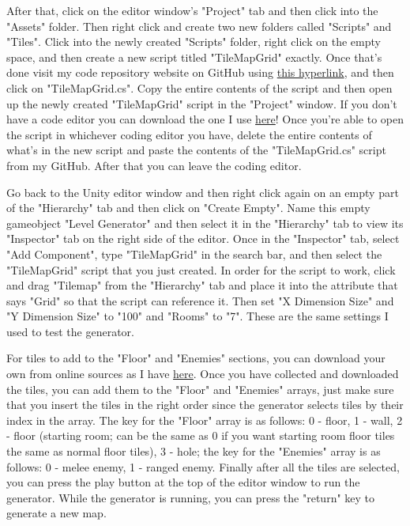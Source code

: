 \documentclass[10pt,twocolumn]{article}
\begin{document}
After that, click on the editor window's "Project" tab and then click into the "Assets" folder. Then right click and create two new folders called "Scripts" and "Tiles". Click into the newly created "Scripts" folder, right click on the empty space, and then create a new script titled "TileMapGrid" exactly. Once that's done visit my code repository website on GitHub using \href{https://github.com/Lukas-Howlett/SeniorComps}{this hyperlink}, and then click on "TileMapGrid.cs". Copy the entire contents of the script and then open up the newly created "TileMapGrid" script in the "Project" window. If you don't have a code editor you can download the one I use \href{https://code.visualstudio.com/download}{here}! Once you're able to open the script in whichever coding editor you have, delete the entire contents of what's in the new script and paste the contents of the "TileMapGrid.cs" script from my GitHub. After that you can leave the coding editor. 

Go back to the Unity editor window and then right click again on an empty part of the "Hierarchy" tab and then click on "Create Empty". Name this empty gameobject "Level Generator" and then select it in the "Hierarchy" tab to view its "Inspector" tab on the right side of the editor. Once in the "Inspector" tab, select "Add Component", type "TileMapGrid" in the search bar, and then select the "TileMapGrid" script that you just created. In order for the script to work, click and drag "Tilemap" from the "Hierarchy" tab and place it into the attribute that says "Grid" so that the script can reference it. Then set "X Dimension Size" and "Y Dimension Size" to "100" and "Rooms" to "7". These are the same settings I used to test the generator. 

For tiles to add to the "Floor" and "Enemies" sections, you can download your own from online sources as I have \href{https://assetstore.unity.com/packages/2d/environments/free-pixel-art-kit-211149}{here}. Once you have collected and downloaded the tiles, you can add them to the "Floor" and "Enemies" arrays, just make sure that you insert the tiles in the right order since the generator selects tiles by their index in the array. The key for the "Floor" array is as follows: 0 - floor, 1 - wall, 2 - floor (starting room; can be the same as 0 if you want starting room floor tiles the same as normal floor tiles), 3 - hole; the key for the "Enemies" array is as follows: 0 - melee enemy, 1 - ranged enemy. Finally after all the tiles are selected, you can press the play button at the top of the editor window to run the generator. While the generator is running, you can press the "return" key to generate a new map.
\end{document}

